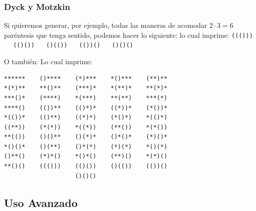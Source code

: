 \documentclass[spanish,professionalfonts]{beamer}
\begin{document}


\begin{frame}[fragile]\frametitle{Dyck y Motzkin}
  Si quieremos generar, por ejemplo, todas las maneras de acomodar $2\cdot 3 = 6$ paréntesis que tenga sentido, podemos hacer lo siguiente:
  \dyckparen
  lo cual imprime: \texttt{((()))} $\quad$  \texttt{(()())} $\quad$  \texttt{()(())} $\quad$ \texttt{(())()} $\quad$  \texttt{()()()}
\end{frame}  

\begin{frame}[fragile]
O también:
  \motzkinparen
  Lo cual imprime:
\begin{verbatim}    
******    ()****    (*)***    *()***    (**)**    
*(*)**    **()**    (***)*    *(**)*    **(*)*    
***()*    (****)    *(***)    **(**)    ***(*)    
****()    (())**    (()*)*    ((*))*    (*())*    
*(())*    (()**)    ((*)*)    (*()*)    *(()*)    
((**))    (*(*))    *((*))    (**())    *(*())    
**(())    ()()**    ()(*)*    ()*()*    (*)()*    
*()()*    ()(**)    ()*(*)    (*)(*)    *()(*)    
()**()    (*)*()    *()*()    (**)()    *(*)()    
**()()    ((()))    (()())    ()(())    (())()    
                    ()()()    
\end{verbatim}
\end{frame}
    

\subsection{Uso Avanzado}
\end{document}
